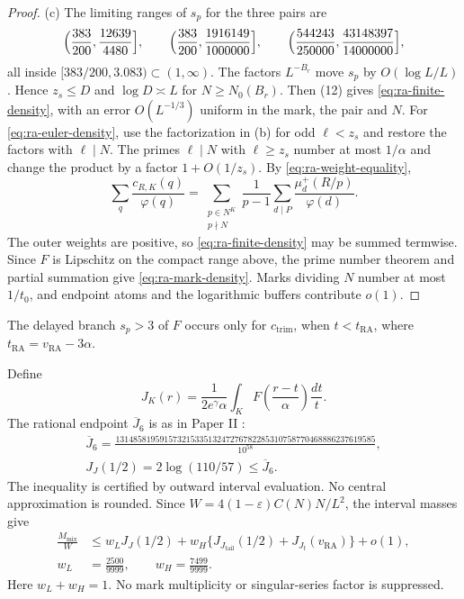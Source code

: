 \begin{proof}
(c) The limiting ranges of \(s_p\) for the three pairs are
\[
 \Bigl(\frac{383}{200},\frac{12639}{4480}\Bigr],\qquad
 \Bigl(\frac{383}{200},\frac{1916149}{1000000}\Bigr],\qquad
 \Bigl(\frac{544243}{250000},\frac{43148397}{14000000}\Bigr],
\]
all inside \([383/200,3.083)\subset(1,\infty)\). The factors \(L^{-B_r}\)
move \(s_p\) by \(O(\log L/L)\). Hence \(z_s\le D\) and \(\log D\asymp L\)
for \(N\ge N_0(B_r)\).
Then (12) gives \eqref{eq:ra-finite-density}, with
an error \(O(L^{-1/3})\) uniform in the mark, the pair and \(N\). For
\eqref{eq:ra-euler-density}, use the factorization in (b) for odd
\(\ell<z_s\) and restore the factors with \(\ell\mid N\). The primes
\(\ell\mid N\) with \(\ell\ge z_s\) number at most \(1/\alpha\) and change
the product by a factor \(1+O(1/z_s)\). By \eqref{eq:ra-weight-equality},
\[
 \sum_q\frac{c_{R,K}(q)}{\varphi(q)}
 =\sum_{\substack{p\in N^K\\p\nmid N}}\frac1{p-1}
   \sum_{d\mid P}\frac{\mu_d^+(R/p)}{\varphi(d)}.
\]
The outer weights are positive, so \eqref{eq:ra-finite-density} may be
summed termwise. Since \(F\) is Lipschitz on the compact range above, the
prime number theorem and partial summation give \eqref{eq:ra-mark-density}.
Marks dividing \(N\) number at most \(1/t_0\), and endpoint atoms and the
logarithmic buffers contribute \(o(1)\).
\end{proof}
The delayed branch \(s_p>3\) of \(F\) occurs only for \(c_{\mathrm{trim}}\),
when \(t<t_{\mathrm{RA}}\), where \(t_{\mathrm{RA}}=v_{\mathrm{RA}}-3\alpha\).


Define
\begin{equation}\label{eq:ra-j-functional}
 J_K(r)=\frac1{2e^\gamma\alpha}
          \int_K F\left(\frac{r-t}{\alpha}\right)\frac{dt}{t}.
\end{equation}
The rational endpoint \(\overline J_6\) is as in Paper II
\cite[(A.13)]{PaperII}:
\begin{equation}\label{eq:ra-j6bar-comparison}
\begin{gathered}
 \overline J_6=
 \frac{13148581959157321533513247276782285310758770468886237619585}
      {10^{58}},\\
 J_J(1/2)=2\log(110/57)\le\overline J_6.
\end{gathered}
\end{equation}
The inequality is certified by outward interval evaluation.
No central approximation is rounded.
Since \(W=4(1-\varepsilon)C(N)N/L^2\), the interval masses give
\begin{equation}\label{eq:ra-main-normalized}
\begin{aligned}
 \frac{M_{\mathrm{mix}}}{W}
 &\le w_LJ_J(1/2)
       +w_H\{J_{J_{\mathrm{tail}}}(1/2)+J_{J_t}(v_{\mathrm{RA}})\}+o(1),\\
 w_L&=\frac{2500}{9999},\qquad w_H=\frac{7499}{9999}.
\end{aligned}
\end{equation}
Here \(w_L+w_H=1\).
No mark multiplicity or singular-series factor is suppressed.

